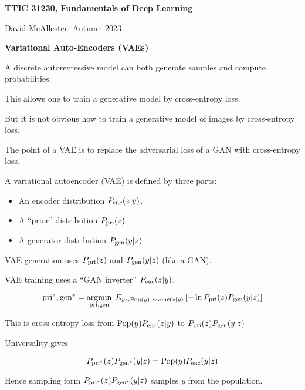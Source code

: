 




{\Huge

  \centerline{\bf TTIC 31230, Fundamentals of Deep
  Learning} \bigskip \centerline{David McAllester, Autumn
  2023} \vfill \vfill \centerline{\bf Variational Auto-Encoders
  (VAEs)} \vfill \vfill


A discrete autoregressive model can both generate samples and compute probabilities.

\vfill
This allows one to train a generative model by cross-entropy loss.

\vfill
But it is not obvious how to train a generative model of images by cross-entropy loss.

\vfill
{\color{red} The point of a VAE is to replace the adversarial loss of a GAN
with cross-entropy loss.}

A variational autoencoder (VAE) is defined by three parts:

\vfill
\begin{itemize}
\item An encoder distribution $P_{\mathrm{enc}}(z|y)$.

\vfill
\item A ``prior'' distribution $P_{\mathrm{pri}}(z)$

\vfill
\item A generator distribution $P_{\mathrm{gen}}(y|z)$
\end{itemize}

\vfill
VAE generation uses $P_{\mathrm{pri}}(z)$ and $P_{\mathrm{gen}}(y|z)$ (like a GAN).

\vfill
VAE training uses a ``GAN inverter'' $P_{\mathrm{enc}}(z|y)$.

$$\mathrm{pri}^*,\mathrm{gen}^* = \operatorname*{argmin}_{\mathrm{pri},\mathrm{gen}}\;E_{y \sim \mathrm{Pop}(y),z \sim \mathrm{enc}(z|y)}\left[-\ln P_{\mathrm{pri}}(z)P_{\mathrm{gen}}(y|z)\right]$$

\vfill
This is cross-entropy loss from $\mathrm{Pop}(y)P_{\mathrm{enc}}(z|y)$ to $P_{\mathrm{pri}}(z)P_{\mathrm{gen}}(y|z)$

\vfill
Universality gives

{\color{red} $$P_{\mathrm{pri}^*}(z)P_{\mathrm{gen}^*}(y|z) = \mathrm{Pop}(y)P_{\mathrm{enc}}(y|z)$$}

\vfill
Hence sampling form $P_{\mathrm{pri}^*}(z)P_{\mathrm{gen}^*}(y|z)$ samples $y$ from the population.



}
